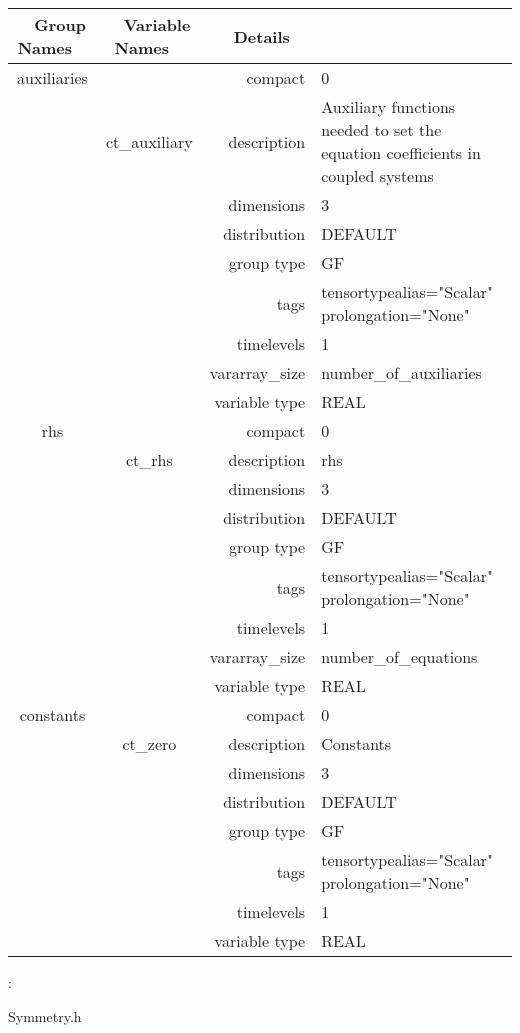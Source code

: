 \begin{tabular*}{150mm}{|c|c@{\extracolsep{\fill}}|rl|} \hline 
~ {\bf Group Names} ~ & ~ {\bf Variable Names} ~  &{\bf Details} ~ & ~ \\ 
\hline 
auxiliaries &  & compact & 0 \\ 
 & ct\_auxiliary & description & Auxiliary functions needed to set the equation coefficients in coupled systems \\ 
 &  & dimensions & 3 \\ 
 &  & distribution & DEFAULT \\ 
 &  & group type & GF \\ 
 &  & tags & tensortypealias="Scalar" prolongation="None" \\ 
 &  & timelevels & 1 \\ 
 &  & vararray\_size & number\_of\_auxiliaries \\ 
 &  & variable type & REAL \\ 
\hline 
rhs &  & compact & 0 \\ 
 & ct\_rhs & description & rhs \\ 
 &  & dimensions & 3 \\ 
 &  & distribution & DEFAULT \\ 
 &  & group type & GF \\ 
 &  & tags & tensortypealias="Scalar" prolongation="None" \\ 
 &  & timelevels & 1 \\ 
 &  & vararray\_size & number\_of\_equations \\ 
 &  & variable type & REAL \\ 
\hline 
constants &  & compact & 0 \\ 
 & ct\_zero & description & Constants \\ 
 &  & dimensions & 3 \\ 
 &  & distribution & DEFAULT \\ 
 &  & group type & GF \\ 
 &  & tags & tensortypealias="Scalar" prolongation="None" \\ 
 &  & timelevels & 1 \\ 
 &  & variable type & REAL \\ 
\hline 
\end{tabular*} 



\vspace{5mm}

: 

Symmetry.h


